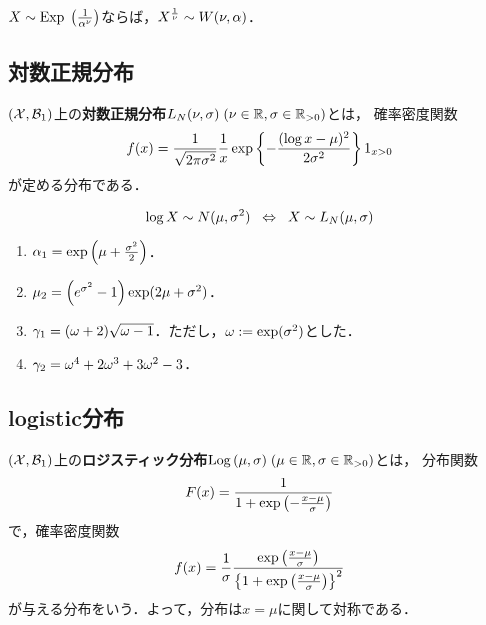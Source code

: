 \documentclass[uplatex,dvipdfmx]{jsreport}
\begin{document}
\begin{proposition}
    $X\sim\mathrm{Exp}\;\left(\frac{1}{\alpha^\nu}\right)$ならば，$X^{\frac{1}{\nu}}\sim W(\nu,\alpha)$．
\end{proposition}

\subsection{対数正規分布}

\begin{definition}
    $(\mathcal{X},\mathcal{B}_1)$上の\textbf{対数正規分布}$L_N(\nu,\sigma)\;(\nu\in\mathbb{R},\sigma\in\mathbb{R}_{>0})$とは，
    確率密度関数
    \[f(x)=\frac{1}{\sqrt{2\pi\sigma^2}}\frac{1}{x}\exp\left\{-\frac{(\log x-\mu)^2}{2\sigma^2}\right\}1_{x>0}\]
    が定める分布である．
\end{definition}

\begin{proposition}
    \[\log X\sim N(\mu,\sigma^2)\;\;\Leftrightarrow\;\; X\sim L_N(\mu,\sigma)\]
\end{proposition}

\begin{proposition}\mbox{}
    \begin{enumerate}
        \item $\alpha_1=\exp\left(\mu+\frac{\sigma^2}{2}\right)$．
        \item $\mu_2=\left(e^{\sigma^2}-1\right)\exp(2\mu+\sigma^2)$．
        \item $\gamma_1=(\omega+2)\sqrt{\omega-1}$．ただし，$\omega:=\exp(\sigma^2)$とした．
        \item $\gamma_2=\omega^4+2\omega^3+3\omega^2-3$．
    \end{enumerate}
\end{proposition}

\subsection{logistic分布}

\begin{definition}
    $(\mathcal{X},\mathcal{B}_1)$上の\textbf{ロジスティック分布}$\mathrm{Log}\,(\mu,\sigma)\;(\mu\in\mathbb{R},\sigma\in\mathbb{R}_{>0})$とは，
    分布関数
    \[F(x)=\frac{1}{1+\exp\left(-\frac{x-\mu}{\sigma}\right)}\]
    で，確率密度関数
    \[f(x)=\frac{1}{\sigma}\frac{\exp\left(\frac{x-\mu}{\sigma}\right)}{\left\{1+\exp\left(\frac{x-\mu}{\sigma}\right)\right\}^2}\]
    が与える分布をいう．よって，分布は$x=\mu$に関して対称である．
\end{definition}
\end{document}
